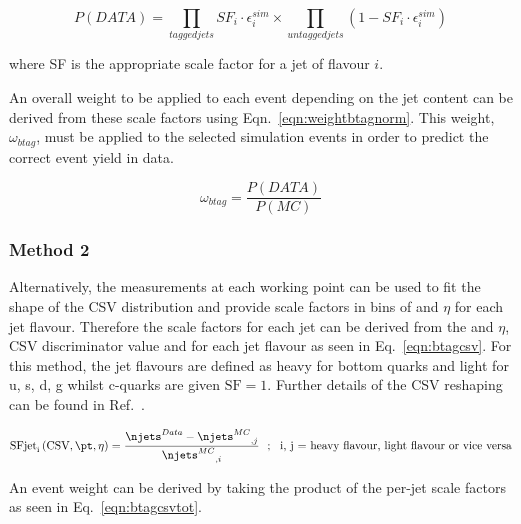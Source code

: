 \begin{centering}
\begin{equation}
P(DATA) = \prod_{tagged jets}SF_{i}\cdot\epsilon^{sim}_{i} \times \prod_{untagged jets}(1- SF_{i}\cdot\epsilon^{sim}_{i})
\end{equation}
\end{centering}
where SF is the appropriate scale factor for a jet of flavour $i$. 

An overall weight to be applied to each event depending on the jet content can be derived from these scale factors using Eqn.~\ref{eqn:weightbtagnorm}. This weight, $\omega_{btag}$, must be applied to the selected simulation events in order to predict the correct event yield in data.

\begin{centering}
\begin{equation}
 \omega_{btag} = \frac{P(DATA)}{P(MC)}
 \label{eqn:weightbtagnorm}
\end{equation}
\end{centering}

\subsubsection{Method 2 ~\label{subsec:method2btag}}

Alternatively, the measurements at each working point can be used to fit the shape of the CSV distribution and provide scale factors in bins of \pt and $\eta$ for each jet flavour. Therefore the scale factors for each jet can be derived from the \pt and $\eta$, CSV discriminator value and for each jet flavour as seen in Eq.~\ref{eqn:btagcsv}. For this method, the jet flavours are defined as heavy for bottom quarks and light for u, s, d, g whilst c-quarks are given $\textrm{SF} = 1$. Further details of the CSV reshaping can be found in Ref.~\cite{CMS-NOTE-2013-130}.

\begin{equation}
\textrm{SFjet}_{\textrm{i}} \left(\textrm{CSV},\pt,\eta \right) = \frac{\njets^{Data} - {\njets^{MC}}_{,j}}{{\njets^{MC}}_{,i}} ~~;~~ \textrm{i, j = heavy flavour, light flavour or vice versa}\label{eqn:btagcsv}
\end{equation}

An event weight can be derived by taking the product of the per-jet scale factors as seen in Eq.~\ref{eqn:btagcsvtot}.

